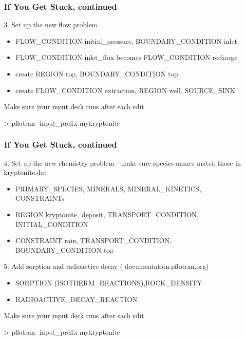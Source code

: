 \documentclass{beamer}
\newcommand\bluecomment[1]{{{\color{blue} #1}}}
\newcommand\greencomment[1]{{{\color{green} #1}}}
\begin{document}
\begin{frame}[fragile]\frametitle{If You Get Stuck, continued}
3. Set up the new flow problem
\begin{itemize}\small
  \item{FLOW\_CONDITION initial\_pressure, BOUNDARY\_CONDITION inlet}
  \item{FLOW\_CONDITION inlet\_flux becomes FLOW\_CONDITION recharge}
  \item{create REGION top, BOUNDARY\_CONDITION top}
  \item{create FLOW\_CONDITION extraction, REGION well, SOURCE\_SINK}
\end{itemize}
Make sure your input deck runs after each edit
\begin{semiverbatim}
  > pflotran -input\_prefix mykryptonite
\end{semiverbatim}
\end{frame}

\begin{frame}[fragile]\frametitle{If You Get Stuck, continued}
4. Set up the new chemistry problem - make sure species names match those in \greencomment{kryptonite.dat}
\begin{itemize}\small
  \item{PRIMARY\_SPECIES, MINERALS, MINERAL\_KINETICS, CONSTRAINTs}
  \item{REGION kryptonite\_deposit, TRANSPORT\_CONDITION, INITIAL\_CONDITION}
  \item{CONSTRAINT rain, TRANSPORT\_CONDITION, BOUNDARY\_CONDITION top}
\end{itemize}
5. Add sorption and radioactive decay (\bluecomment{documentation.pflotran.org})
\begin{itemize}\small
  \item{SORPTION (ISOTHERM\_REACTIONS),ROCK\_DENSITY}
  \item{RADIOACTIVE\_DECAY\_REACTION}
\end{itemize}
Make sure your input deck runs after each edit
\begin{semiverbatim}
  > pflotran -input\_prefix mykryptonite
\end{semiverbatim}
\end{frame}
\end{document}
